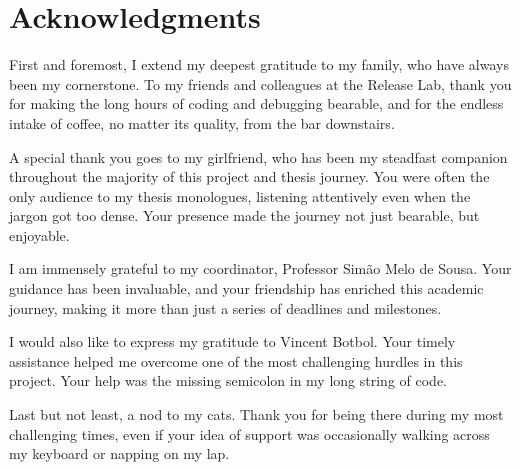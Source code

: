 \chapter*{Acknowledgments}

First and foremost, I extend my deepest gratitude to my family, who have always been my cornerstone. To my friends and colleagues at the Release Lab, thank you for making the long hours of coding and debugging bearable, and for the endless intake of coffee, no matter its quality, from the bar downstairs.

A special thank you goes to my girlfriend, who has been my steadfast companion throughout the majority of this project and thesis journey. You were often the only audience to my thesis monologues, listening attentively even when the jargon got too dense. Your presence made the journey not just bearable, but enjoyable.

I am immensely grateful to my coordinator, Professor Simão Melo de Sousa. Your guidance has been invaluable, and your friendship has enriched this academic journey, making it more than just a series of deadlines and milestones.

I would also like to express my gratitude to Vincent Botbol. Your timely assistance helped me overcome one of the most challenging hurdles in this project. Your help was the missing semicolon in my long string of code.

Last but not least, a nod to my cats. Thank you for being there during my most challenging times, even if your idea of support was occasionally walking across my keyboard or napping on my lap.

